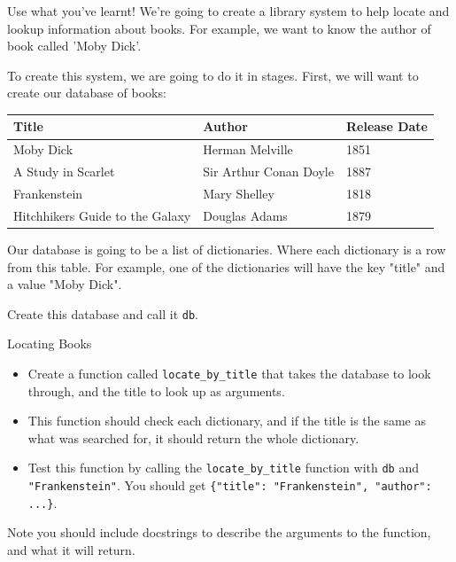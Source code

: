 \documentclass[10pt]{beamer}
\begin{document}
\begin{frame}[label={sec:orgdd6815c},fragile]{Use what you've learnt!}
 We're going to create a library system to help locate and lookup information about
books. For example, we want to know the author of book called 'Moby Dick'.

To create this system, we are going to do it in stages. First, we will want to create
our database of books:

\begin{center}
\begin{tabularx}{\textwidth}{XXX}
Title & Author & Release Date\\
\hline
Moby Dick & Herman Melville & 1851\\
A Study in Scarlet & Sir Arthur Conan Doyle & 1887\\
Frankenstein & Mary Shelley & 1818\\
Hitchhikers Guide to the Galaxy & Douglas Adams & 1879\\
\end{tabularx}
\end{center}

Our database is going to be a list of dictionaries. Where each dictionary is a row
from this table. For example, one of the dictionaries will have the key "title" and a
value "Moby Dick".

Create this database and call it \texttt{db}.
\end{frame}

\begin{frame}[label={sec:org6041edf},fragile]{Locating Books}
 \begin{itemize}
\item Create a function called \texttt{locate\_by\_title} that takes the database to look through,
and the title to look up as arguments.
\item This function should check each dictionary, and if the title is the same as what
was searched for, it should return the whole dictionary.
\item Test this function by calling the \texttt{locate\_by\_title} function with \texttt{db} and
\texttt{"Frankenstein"}. You should get \texttt{\{"title": "Frankenstein", "author": ...\}}.
\end{itemize}

\alert{Note} you should include docstrings to describe the arguments to the function, and
what it will return.
\end{frame}
\end{document}
